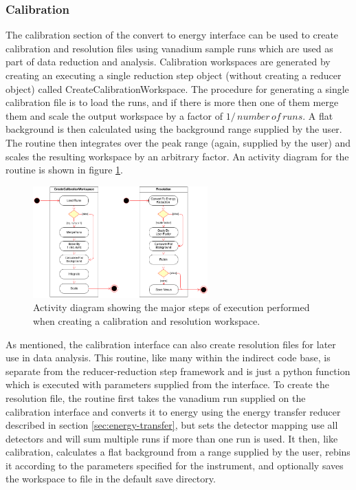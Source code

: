 \documentclass[paper=a4, fontsize=11pt]{scrartcl}	%
\numberwithin{equation}{section}															%
\numberwithin{figure}{section}																%
\numberwithin{table}{section}																%
\begin{document}
\subsubsection{Calibration}
\label{subsec:c2e-calibration}
The calibration section of the convert to energy interface can be used to create calibration and resolution files using vanadium sample runs which are used as part of data reduction and analysis. Calibration workspaces are generated by creating an executing a single reduction step object  (without creating a reducer object) called CreateCalibrationWorkspace. The procedure for generating a single calibration file is to load the runs, and if there is more then one of them merge them and scale the output workspace by a factor of $1/\,number\,of\,runs$. A flat background is then calculated using the background range supplied by the user. The routine then integrates over the peak range (again, supplied by the user) and scales the resulting workspace by an arbitrary factor. An activity diagram for the routine is shown in figure \ref{fig:c2e-calibration-activity-diagram}.

\begin{figure}[H]
\centering
\includegraphics[width=0.6\textwidth]{img/uml/activity_diagrams/Calibration_activity.png}
\caption{Activity diagram showing the major steps of execution performed when creating a calibration and resolution workspace.}
\label{fig:c2e-calibration-activity-diagram}
\end{figure}

As mentioned, the calibration interface can also create resolution files for later use in data analysis. This routine, like many within the indirect code base, is separate from the reducer-reduction step  framework and is just a python function which is executed with parameters supplied from the interface. To create the resolution file, the routine first takes the vanadium run supplied on the calibration interface and converts it to energy using the energy transfer reducer described in section \ref{sec:energy-transfer}, but sets the detector mapping use all detectors and will sum multiple runs if more than one run is used. It then, like calibration, calculates a flat background from a range supplied by the user, rebins it according to the parameters specified for the instrument, and optionally saves the workspace to file in the default save directory.
\end{document}
